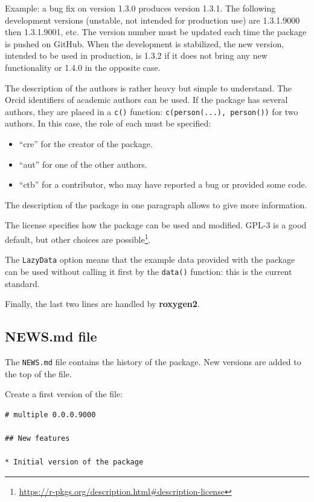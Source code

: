 \documentclass[
  12pt,
  american,
  a4paper,
  extrafontsizes,onecolumn,openright
  ]{memoir}
\providecommand{\tightlist}{%
  \setlength{\itemsep}{0pt}\setlength{\parskip}{0pt}}
\begin{document}
Example: a bug fix on version 1.3.0 produces version 1.3.1.
The following development versions (unstable, not intended for production use) are 1.3.1.9000 then 1.3.1.9001, etc.
The version number must be updated each time the package is pushed on GitHub.
When the development is stabilized, the new version, intended to be used in production, is 1.3.2 if it does not bring any new functionality or 1.4.0 in the opposite case.

The description of the authors is rather heavy but simple to understand.
The Orcid identifiers of academic authors can be used.
If the package has several authors, they are placed in a \texttt{c()} function: \texttt{c(person(...),\ person())} for two authors.
In this case, the role of each must be specified:

\begin{itemize}
\tightlist
\item
  \enquote{cre} for the creator of the package.
\item
  \enquote{aut} for one of the other authors.
\item
  \enquote{ctb} for a contributor, who may have reported a bug or provided some code.
\end{itemize}

The description of the package in one paragraph allows to give more information.

The license specifies how the package can be used and modified.
GPL-3 is a good default, but other choices are possible\footnote{\url{https://r-pkgs.org/description.html\#description-license}}.

The \texttt{LazyData} option means that the example data provided with the package can be used without calling it first by the \texttt{data()} function: this is the current standard.

Finally, the last two lines are handled by \textbf{roxygen2}.

\hypertarget{news.md-file}{%
\subsection{NEWS.md file}\label{news.md-file}}

The \texttt{NEWS.md} file contains the history of the package.
New versions are added to the top of the file.

Create a first version of the file:

\begin{verbatim}
# multiple 0.0.0.9000

## New features

* Initial version of the package
\end{verbatim}
\end{document}
